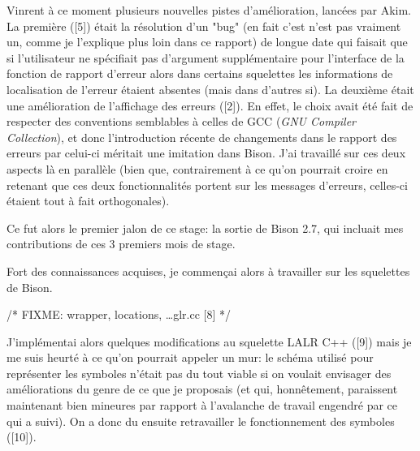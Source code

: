 \documentclass[a4paper,11pt,twoside,final]{article}
\begin{document}
  Vinrent à ce moment plusieurs nouvelles pistes d'amélioration, lancées par
  Akim. La première ([5]) était la résolution d'un "bug" (en fait c'est n'est
  pas vraiment un, comme je l'explique plus loin dans ce rapport) de longue
  date qui faisait que si l'utilisateur ne spécifiait pas d'argument
  supplémentaire pour l'interface de la fonction de rapport d'erreur alors dans
  certains squelettes les informations de localisation de l'erreur étaient
  absentes (mais dans d'autres si). La deuxième était une amélioration de
  l'affichage des erreurs ([2]). En effet, le choix avait été fait de respecter
  des conventions semblables à celles de GCC (\textit{GNU Compiler
  Collection}), et donc l'introduction récente de changements dans le rapport
  des erreurs par celui-ci méritait une imitation dans Bison. J'ai travaillé
  sur ces deux aspects là en parallèle (bien que, contrairement à ce qu'on
  pourrait croire en retenant que ces deux fonctionnalités portent sur les
  messages d'erreurs, celles-ci étaient tout à fait orthogonales).

  Ce fut alors le premier jalon de ce stage: la sortie de Bison 2.7, qui
  incluait mes contributions de ces 3 premiers mois de stage.

  Fort des connaissances acquises, je commençai alors à travailler sur les
  squelettes de Bison.

  /* FIXME: wrapper, locations, \ldots glr.cc [8] */

  J'implémentai alors quelques modifications au squelette LALR C++ ([9]) mais
  je me suis heurté à ce qu'on pourrait appeler un mur: le schéma utilisé pour
  représenter les symboles n'était pas du tout viable si on voulait envisager
  des améliorations du genre de ce que je proposais (et qui, honnêtement,
  paraissent maintenant bien mineures par rapport à l'avalanche de travail
  engendré par ce qui a suivi). On a donc du ensuite retravailler le
  fonctionnement des symboles ([10]).
\end{document}
